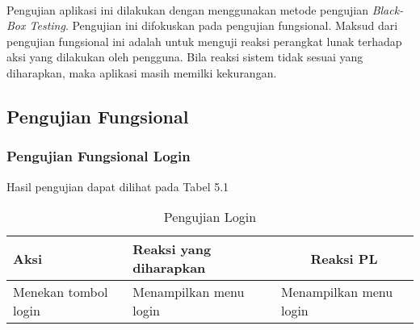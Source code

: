 \paragraph{} Pengujian aplikasi ini dilakukan dengan menggunakan metode pengujian \textit{Black-Box Testing}. Pengujian ini difokuskan pada pengujian fungsional. Maksud dari pengujian fungsional ini adalah untuk menguji reaksi perangkat lunak terhadap aksi yang dilakukan oleh pengguna. Bila reaksi sistem tidak sesuai yang diharapkan, maka aplikasi masih memilki kekurangan.

\subsection{Pengujian Fungsional}
\subsubsection{Pengujian Fungsional Login}
Hasil pengujian dapat dilihat pada Tabel 5.1
\begin{center}
	\begin{table}[H]
		\caption{Pengujian Login}
		\begin{tabular}{|p{5cm}|p{5cm}|p{5cm}|}
		\hline
		\centering Aksi	& 	\centering Reaksi yang diharapkan &  \multicolumn{1}{c|}{Reaksi PL} \\
		\hline
		Menekan tombol login & Menampilkan menu login & Menampilkan menu login \\
		\hline
		\end{tabular}
	\end{table}
\end{center}

